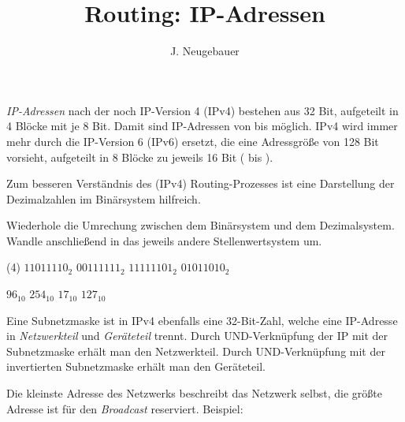 \documentclass[10pt, a4paper]{scrartcl}
\author{J. Neugebauer}
\title{Routing: IP-Adressen}
\date{\Heute}
\begin{document}
\ReiheTitel

\emph{IP-Adressen} nach der noch  IP-Version 4 (IPv4) bestehen aus 32 Bit, aufgeteilt in 4 Blöcke mit je 8 Bit. Damit sind IP-Adressen von  bis  möglich. IPv4 wird immer mehr durch die IP-Version 6 (IPv6) ersetzt, die eine Adressgröße von 128 Bit vorsieht, aufgeteilt in 8 Blöcke zu jeweils 16 Bit ( bis ).

Zum besseren Verständnis des (IPv4) Routing-Prozesses ist eine Darstellung der Dezimalzahlen im Binärsystem hilfreich.

\begin{aufgabe}
	Wiederhole die Umrechung zwischen dem Binärsystem und dem Dezimalsystem. Wandle anschließend in das jeweils andere Stellenwertsystem um.
	
	\begin{tasks}(4)
		\task $1101 1110_2$
		\task $0011 1111_2$
		\task $1111 1101_2$
		\task $0101 1010_2$
		
		\task $96_{10}$
		\task $254_{10}$
		\task $17_{10}$
		\task $127_{10}$
	\end{tasks}
\end{aufgabe}

Eine Subnetzmaske ist in IPv4 ebenfalls eine 32-Bit-Zahl, welche eine IP-Adresse in \emph{Netzwerkteil} und \emph{Geräteteil} trennt. Durch UND-Verknüpfung der IP mit der Subnetzmaske erhält man den Netzwerkteil. Durch UND-Verknüpfung mit der invertierten Subnetzmaske erhält man den Geräteteil.

Die kleinste Adresse des Netzwerks beschreibt das Netzwerk selbst, die größte Adresse ist für den \emph{Broadcast} reserviert. Beispiel:
\end{document}
